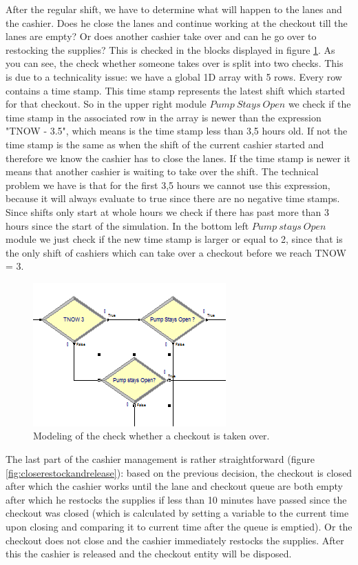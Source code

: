 After the regular shift, we have to determine what will happen to the lanes and the cashier. Does he close the lanes and continue working at the checkout till the lanes are empty? Or does another cashier take over and can he go over to restocking the supplies? This is checked in the blocks displayed in figure \ref{fig:determinetakeover}. As you can see, the check whether someone takes over is split into two checks. This is due to a technicality issue: we have a global 1D array with 5 rows. Every row contains a time stamp. This time stamp represents the latest shift which started for that checkout. So in the upper right module $Pump \ Stays \ Open$ we check if the time stamp in the associated row in the array is newer than the expression "TNOW - 3.5", which means is the time stamp less than 3,5 hours old. If not the time stamp is the same as when the shift of the current cashier started and therefore we know the cashier has to close the lanes. If the time stamp is newer it means that another cashier is waiting to take over the shift. The technical problem we have is that for the first 3,5 hours we cannot use this expression, because it will always evaluate to true since there are no negative time stamps. Since shifts only start at whole hours we check if there has past more than 3 hours since the start of the simulation. In the bottom left $Pump \ stays \ Open$ module we just check if the new time stamp is larger or equal to 2, since that is the only shift of cashiers which can take over a checkout before we reach TNOW = 3. 

\begin{figure}[]
\begin{center}
	\includegraphics[scale=1]{images/model-description/determine-takeover.PNG}
	\caption{Modeling of the check whether a checkout is taken over.}
	\label{fig:determinetakeover}
\end{center}
\end{figure}

The last part of the cashier management is rather straightforward (figure \ref{fig:closerestockandrelease}): based on the previous decision, the checkout is closed after which the cashier works until the lane and checkout queue are both empty after which he restocks the supplies if less than 10 minutes have passed since the checkout was closed (which is calculated by setting a variable to the current time upon closing and comparing it to current time after the queue is emptied). Or the checkout does not close and the cashier immediately restocks the supplies.
After this the cashier is released and the checkout entity will be disposed.


